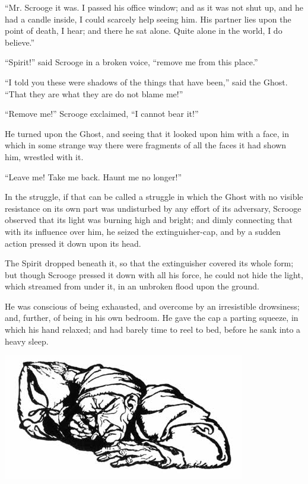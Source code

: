 \documentclass[paper=a5,BCOR=15mm,twoside,DIV=15,headinclude=off,12pt,chapterprefix=off,openany,headings=huge]{scrbook} %
\begin{document}
\enquote{Mr. Scrooge it was. I passed his office window; and as it was not shut up, and he had a candle inside, I could scarcely help seeing him. His partner lies upon the point of death, I hear; and there he sat alone. Quite alone in the world, I do believe.}

\enquote{Spirit!} said Scrooge in a broken voice, \enquote{remove me from this place.}

\enquote{I told you these were shadows of the things that have been,} said the Ghost. \enquote{That they are what they are do not blame me!}

\enquote{Remove me!} Scrooge exclaimed, \enquote{I cannot bear it!}

He turned upon the Ghost, and seeing that it looked upon him with a face, in which in some strange way there were fragments of all the faces it had shown him, wrestled with it.

\enquote{Leave me! Take me back. Haunt me no longer!}

In the struggle, if that can be called a struggle in which the Ghost with no visible resistance on its own part was undisturbed by any effort of its adversary, Scrooge observed that its light was burning high and bright; and dimly connecting that with its influence over him, he seized the extinguisher-cap, and by a sudden action pressed it down upon its head.



The Spirit dropped beneath it, so that the extinguisher covered its whole form; but though Scrooge pressed it down with all his force, he could not hide the light, which streamed from under it, in an unbroken flood upon the ground.

He was conscious of being exhausted, and overcome by an irresistible drowsiness; and, further, of being in his own bedroom. He gave the cap a parting squeeze, in which his hand relaxed; and had barely time to reel to bed, before he sank into a heavy sleep.

\begin{minipage}[c]{\linewidth}
\includegraphics[width=\linewidth]{gs090}
\end{minipage}
\end{document}
